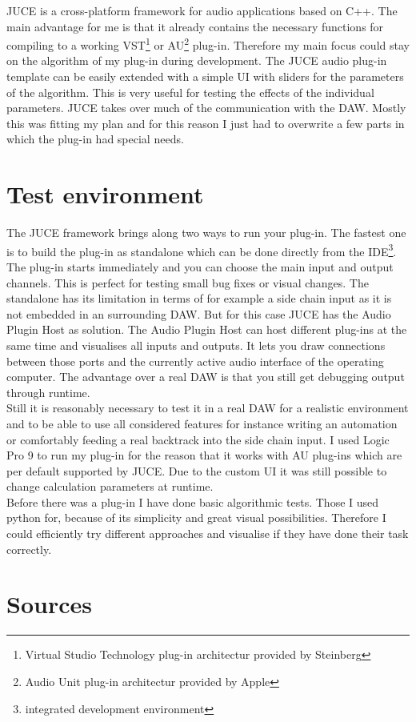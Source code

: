 JUCE is a cross-platform framework for audio applications based on C++. The main advantage for me is that it already contains the necessary functions for compiling to a working VST\footnote{Virtual Studio Technology plug-in architectur provided by Steinberg} or AU\footnote{Audio Unit plug-in architectur provided by Apple} plug-in. Therefore my main focus could stay on the algorithm of my plug-in during development. The JUCE audio plug-in template can be easily extended with a simple UI with sliders for the parameters of the algorithm. This is very useful for testing the effects of the individual parameters. JUCE takes over much of the communication with the DAW. Mostly this was fitting my plan and for this reason I just had to overwrite a few parts in which the plug-in had special needs.\\

\section{Test environment}

The JUCE framework brings along two ways to run your plug-in. The fastest one is to build the plug-in as standalone which can be done directly from the IDE\footnote{integrated development environment}. The plug-in starts immediately and you can choose the main input and output channels. This is perfect for testing small bug fixes or visual changes. The standalone has its limitation in terms of for example a side chain input as it is not embedded in an surrounding DAW. But for this case JUCE has the Audio Plugin Host as solution. The Audio Plugin Host can host different plug-ins at the same time and visualises all inputs and outputs. It lets you draw connections between those ports and the currently active audio interface of the operating computer. The advantage over a real DAW is that you still get debugging output through runtime.\\
Still it is reasonably necessary to test it in a real DAW for a realistic environment and to be able to use all considered features for instance writing an automation or comfortably feeding a real backtrack into the side chain input. I used Logic Pro 9 to run my plug-in for the reason that it works with AU plug-ins which are per default supported by JUCE. Due to the custom UI it was still possible to change calculation parameters at runtime.\\
Before there was a plug-in I have done basic algorithmic tests. Those I used python for, because of its simplicity and great visual possibilities. Therefore I could efficiently try different approaches and visualise if they have done their task correctly.\\

\section{Sources}
